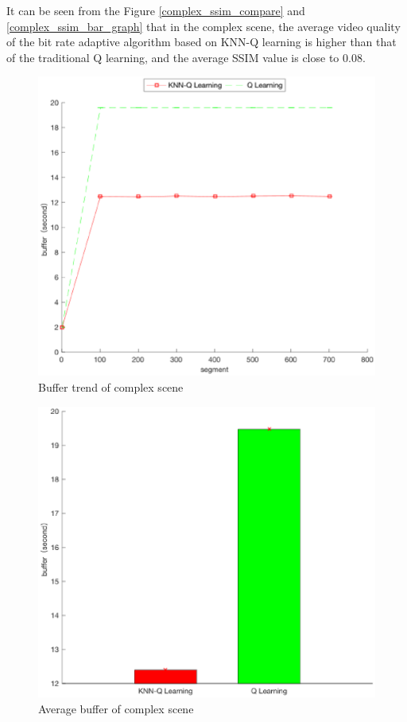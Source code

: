 \documentclass[twocolumn]{article}
\begin{document}
It can be seen from the Figure \ref{complex_ssim_compare} and \ref{complex_ssim_bar_graph} that in the complex scene, 
the average video quality of the bit rate adaptive algorithm based on 
KNN-Q learning is higher than that of the traditional Q learning, and the average SSIM value is close to 0.08.
\begin{figure}[htbp]
\centering
\includegraphics[width=\columnwidth]{complex_buffer_compare}
\caption{Buffer trend of complex scene }
\label{complex_buffer_compare}
\end{figure}
\begin{figure}[htbp]
\centering
\includegraphics[width=\columnwidth]{complex_buffer_bar_graph}
\caption{Average buffer of complex scene}
\label{complex_buffer_bar_graph}
\end{figure}
\end{document}
